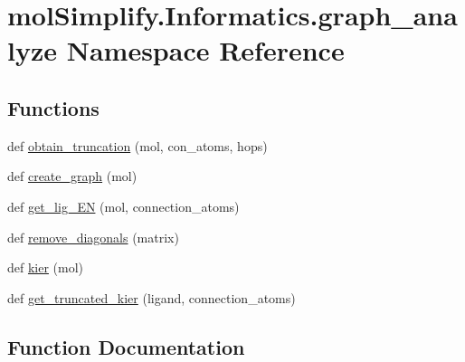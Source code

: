 \hypertarget{namespacemolSimplify_1_1Informatics_1_1graph__analyze}{}\section{mol\+Simplify.\+Informatics.\+graph\+\_\+analyze Namespace Reference}
\label{namespacemolSimplify_1_1Informatics_1_1graph__analyze}
\subsection*{Functions}
\begin{DoxyCompactItemize}
\item 
def \hyperlink{namespacemolSimplify_1_1Informatics_1_1graph__analyze_a30f8c122f0b3bc6395f61036e5cdc318}{obtain\+\_\+truncation} (mol, con\+\_\+atoms, hops)
\item 
def \hyperlink{namespacemolSimplify_1_1Informatics_1_1graph__analyze_a0d46f8d11eb44ac8146cd744e540260a}{create\+\_\+graph} (mol)
\item 
def \hyperlink{namespacemolSimplify_1_1Informatics_1_1graph__analyze_a992caaa8a4151941aa25f2cfdbfd6401}{get\+\_\+lig\+\_\+\+EN} (mol, connection\+\_\+atoms)
\item 
def \hyperlink{namespacemolSimplify_1_1Informatics_1_1graph__analyze_a5b0465369f9bc4082fee1ed6fe4503fb}{remove\+\_\+diagonals} (matrix)
\item 
def \hyperlink{namespacemolSimplify_1_1Informatics_1_1graph__analyze_a5285fe4efc5755038a5ad17ed482e519}{kier} (mol)
\item 
def \hyperlink{namespacemolSimplify_1_1Informatics_1_1graph__analyze_a3a417966f569cf76228b480d9e292423}{get\+\_\+truncated\+\_\+kier} (ligand, connection\+\_\+atoms)
\end{DoxyCompactItemize}


\subsection{Function Documentation}
\mbox{\label{namespacemolSimplify_1_1Informatics_1_1graph__analyze_a0d46f8d11eb44ac8146cd744e540260a}} 
